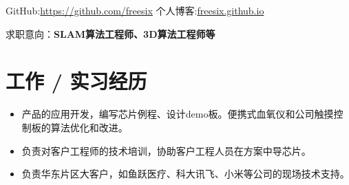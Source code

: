 \documentclass{resume}
\begin{document}


{\centerline{}}
{\qquad \qquad \qquad \qquad \qquad
{GitHub:\href{https://github.com/freesix}{https://github.com/freesix}}\quad
个人博客:\href{https://freesix.github.io/}{freesix.github.io}}


求职意向：\textbf{SLAM算法工程师、3D算法工程师等}
\section{\textcolor[RGB]{50,50,190}{\faBriefcase 工作 / 实习经历}}

\begin{itemize}
  \item 产品的应用开发，编写芯片例程、设计demo板。便携式血氧仪和公司触摸控制板的算法优化和改进。
  \item 负责对客户工程师的技术培训，协助客户工程人员在方案中导芯片。
  \item 负责华东片区大客户，如鱼跃医疗、科大讯飞、小米等公司的现场技术支持。
\end{itemize}
\end{document}
